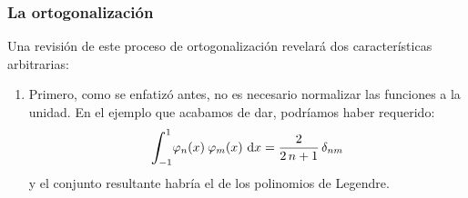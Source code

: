 \documentclass[12pt]{beamer}
\begin{document}
\begin{frame}
\frametitle{La ortogonalización}
Una revisión de este proceso de ortogonalización revelará dos características arbitrarias:
\pause
{}
\begin{enumerate}[<+->]
\item Primero, como se enfatizó antes, no es necesario normalizar las funciones a la unidad.
En el ejemplo que acabamos de dar, podríamos haber requerido:
\pause
\begin{align}
\scaleint{6ex}_{\bs -1}^{1} \varphi_{n} (x) \: \varphi_{m} (x) \, \dd{x} = \dfrac{2}{2 \, n +1} \, \delta_{nm}
\label{eq:ecuacion_10_61}
\end{align}
y el conjunto resultante habría el de los polinomios de Legendre.
\seti
\end{enumerate}
\end{frame}
\end{document}
